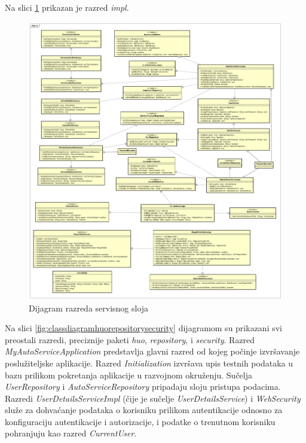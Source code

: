 		Na slici \ref{fig:classdiagramimpl} prikazan je razred \textit{impl}.
	
		\begin{figure}[H]
			\centering
			\includegraphics[width=1.0\linewidth]{dijagrami/class_diagram_impl.png}
			\caption{Dijagram razreda servisnog sloja}
			\label{fig:classdiagramimpl}
		\end{figure}
	
		Na slici \ref{fig:classdiagramhuorepositorysecurity} dijagramom su prikazani svi preostali razredi, preciznije paketi \textit{huo}, \textit{repository}, i \textit{security}. Razred \textit{MyAutoServiceApplication} predstavlja glavni razred od kojeg počinje izvršavanje poslužiteljske aplikacije. Razred \textit{Initialization} izvršava upis testnih podataka u bazu prilikom pokretanja aplikacije u razvojnom okruženju. Sučelja \textit{UserRepository} i \textit{AutoServiceRepository} pripadaju sloju pristupa podacima. Razredi \textit{UserDetailsServiceImpl} (čije je sučelje \textit{UserDetailsService}) i \textit{WebSecurity} služe za dohvaćanje podataka o korisniku prilikom autentikacije odnosno za konfiguraciju autentikacije i autorizacije, i podatke o trenutnom korisniku pohranjuju kao razred \textit{CurrentUser}.
	
